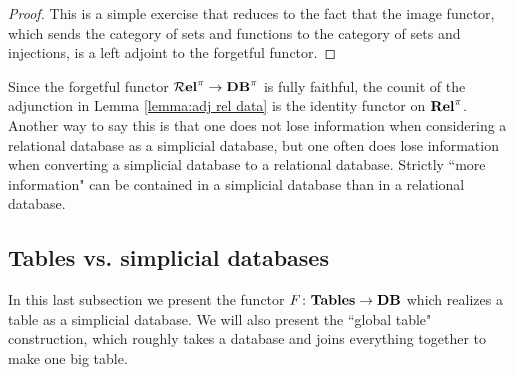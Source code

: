 \documentclass{amsart}
\begin{document}
\begin{proof}

This is a simple exercise that reduces to the fact that the image functor, which sends the category of sets and functions to the category of sets and injections, is a left adjoint to the forgetful functor.

\end{proof}

Since the forgetful functor ${\bf \mathcal{R} el}^\pi\rightarrow{\bf DB}^\pi$ is fully faithful, the counit of the adjunction in Lemma \ref{lemma:adj rel data} is the identity functor on ${\bf Rel}^\pi$.  Another way to say this is that one does not lose information when considering a relational database as a simplicial database, but one often does lose information when converting a simplicial database to a relational database.  Strictly ``more information" can be contained in a simplicial database than in a relational database.

\subsection{Tables vs. simplicial databases}

In this last subsection we present the functor $F\colon{\bf Tables}\rightarrow{\bf DB}$ which realizes a table as a simplicial database.  We will also present the ``global table" construction, which roughly takes a database and joins everything together to make one big table.
\end{document}
